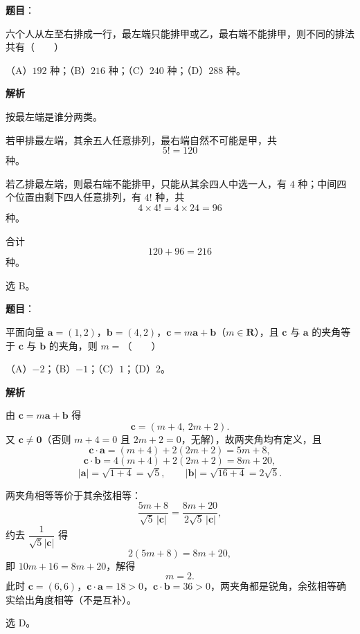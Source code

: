 \begin{answer}

\textbf{题目}：

六个人从左至右排成一行，最左端只能排甲或乙，最右端不能排甲，则不同的排法共有\mbox{（　　）}

（A）$192$ 种；（B）$216$ 种；（C）$240$ 种；（D）$288$ 种。

\textbf{解析}

按最左端是谁分两类。

若甲排最左端，其余五人任意排列，最右端自然不可能是甲，共
\nopagebreak[4]
\[5!=120\]
种。

若乙排最左端，则最右端不能排甲，只能从其余四人中选一人，有 $4$ 种；中间四个位置由剩下四人任意排列，有 $4!$ 种，共
\nopagebreak[4]
\[4\times 4!=4\times 24=96\]
种。

合计
\nopagebreak[4]
\[120+96=216\]
种。

选 B。


\end{answer}
\begin{answer}

\textbf{题目}：

平面向量 $\boldsymbol a=(1,2)$，$\boldsymbol b=(4,2)$，$\boldsymbol c=m\boldsymbol a+\boldsymbol b$（$m\in\mathbf R$），且 $\boldsymbol c$ 与 $\boldsymbol a$ 的夹角等于 $\boldsymbol c$ 与 $\boldsymbol b$ 的夹角，则 $m=$\mbox{（　　）}

（A）$-2$；（B）$-1$；（C）$1$；（D）$2$。

\textbf{解析}

由 $\boldsymbol c=m\boldsymbol a+\boldsymbol b$ 得
\nopagebreak[4]
\[\boldsymbol c=(m+4,\,2m+2).\]
又 $\boldsymbol c\neq\boldsymbol 0$（否则 $m+4=0$ 且 $2m+2=0$，无解），故两夹角均有定义，且
\nopagebreak[4]
\[\boldsymbol c\cdot\boldsymbol a=(m+4)+2(2m+2)=5m+8,\]
\nopagebreak[4]
\[\boldsymbol c\cdot\boldsymbol b=4(m+4)+2(2m+2)=8m+20,\]
\nopagebreak[4]
\[|\boldsymbol a|=\sqrt{1+4}=\sqrt5,\qquad |\boldsymbol b|=\sqrt{16+4}=2\sqrt5 .\]

两夹角相等等价于其余弦相等：
\nopagebreak[4]
\[\frac{5m+8}{\sqrt5\,|\boldsymbol c|}=\frac{8m+20}{2\sqrt5\,|\boldsymbol c|},\]
约去 $\dfrac1{\sqrt5|\boldsymbol c|}$ 得
\nopagebreak[4]
\[2(5m+8)=8m+20,\]
即 $10m+16=8m+20$，解得
\nopagebreak[4]
\[m=2 .\]
此时 $\boldsymbol c=(6,6)$，$\boldsymbol c\cdot\boldsymbol a=18>0$，$\boldsymbol c\cdot\boldsymbol b=36>0$，两夹角都是锐角，余弦相等确实给出角度相等（不是互补）。

选 D。


\end{answer}
